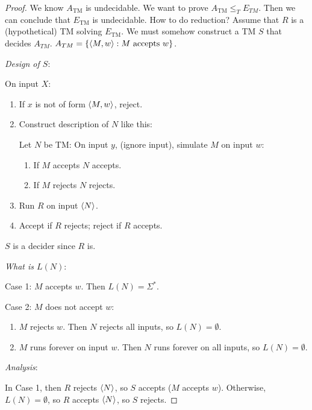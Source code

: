 \begin{proof}
    We know $A_{\text{TM}}$ is undecidable. We want to prove $A_{\text{TM}} \leq_{T} E_{TM}$. Then we can conclude that $E_{\text{TM}}$ is undecidable.
    How to do reduction? Assume that $R$ is a (hypothetical) TM solving $E_{\text{TM}}$. We must somehow construct a TM $S$ that decides $A_{TM}$. $A_{TM} = \{\left \langle M, w \right \rangle: M \text{ accepts } w\}$.

    \emph{Design of $S$}:

    On input $X$:
    \begin{enumerate}
        \item If $x$ is not of form $\left \langle M, w \right \rangle$, reject.
        \item Construct description of $N$ like this:

        Let $N$ be TM: On input $y$, (ignore input), simulate $M$ on input $w$:

        \begin{enumerate}
            \item If $M$ accepts $N$ accepts.
            \item If $M$ rejects $N$ rejects.
        \end{enumerate}

        \item Run $R$ on input $\left \langle N \right \rangle$.
        \item Accept if $R$ rejects; reject if $R$ accepts.
    \end{enumerate}

    $S$ is a decider since $R$ is.

    \emph{What is $L(N)$}:

    Case 1: $M$ accepts $w$. Then $L(N) = \Sigma^*$.

    Case 2: $M$ does not accept $w$:

    \begin{enumerate}[2a.]
        \item $M$ rejects $w$. Then $N$ rejects all inputs, so $L(N) = \emptyset$.
        \item $M$ runs forever on input $w$. Then $N$ runs forever on all inputs, so $L(N) = \emptyset$.
    \end{enumerate}

    \emph{Analysis}:

    In Case 1, then $R$ rejects $\left \langle N \right \rangle$, so $S$ accepts ($M$ accepts $w$). Otherwise, $L(N) = \emptyset$, so $R$ accepts $\left \langle N \right \rangle$, so $S$ rejects.
\end{proof}

